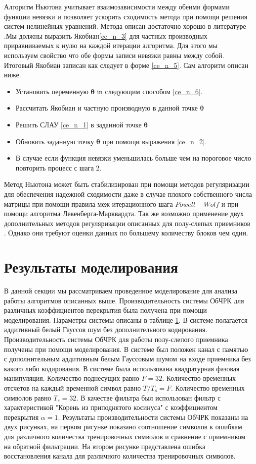 Алгоритм Ньютона учитывает взаимозависимости между обеими формами функции невязки и позволяет ускорить сходимость метода при помощи решения систем нелинейных уравнений. Метода описан достаточно хорошо в литературе \cite{Book62}.Мы должны выразить Якобиан\eqref{ce_n_3} для частных производных приравниваемых к нулю на каждой итерации алгоритма. Для этого мы используем свойство что обе формы записи невязки равны между собой. Итоговый Якобиан записан как следует в форме \eqref{ce_n_5}. Сам алгоритм описан ниже. 
\begin{itemize}
\item Установить переменную $\mathbf{\theta}$ in следующим способом \eqref{ce_n_6}.
\item Рассчитать Якобиан и частную производную в данной точке $\mathbf{\theta}$
\item Решить СЛАУ \eqref{ce_n_1} в заданной точке $\mathbf{\theta}$
\item Обновить заданную точку $\mathbf{\theta}$ при помощи выражения \eqref{ce_n_2}.
\item В случае если функция невязки уменьшилась больше чем на пороговое число повторить процесс с шага 2.
\end{itemize}
Метод Ньютона может быть стабилизирован при помощи методов регуляризации для обеспечения  надежной сходимости даже в случае плохого собственного числа матрицы при помощи правила меж-итерационного шага $Powell-Wolf$ \cite{Book66} и при помощи алгоритма Левенберга-Марквардта\cite{Book65}. Так же возможно применение двух дополнительных методов регуляризации описанных для полу-слепых приемников \cite{Book53}\cite{Book52}. Однако они требуют оценки данных по большему количеству блоков чем один.
\section{Результаты моделирования}
В данной секции мы рассматриваем проведенное моделирование для анализа работы алгоритмов описанных выше.
Производительность системы ОбЧРК для различных коэффициентов перекрытия была получена при помощи моделирования. Параметры системы описаны в таблице \ref{}. В системе полагается аддитивный белый Гауссов шум без дополнительного кодирования.
Производительность системы ОбЧРК для работы полу-слепого приемника получены при помощи моделирования. В системе был положен канал с памятью с дополнительным аддитивным белым Гауссовым шумом на входе приемника без какого либо кодирования. В системе была использована квадратурная фазовая манипуляция. Количество поднесущих равно $F=32$. Количество временных отсчетов на каждый временной символ равно $T/T_s=F$. Количество временных символов равно $T_s=32$. В качестве фильтра был использован фильтр с характеристикой "Корень из приподнятого косинуса" с коэффициентом перекрытия $\alpha=1$.  Результаты производительности системы ОбЧРК  показаны на двух рисунках, на первом рисунке показано соотношение символов к ошибкам для различного количества тренировочных символов и сравнение с приемником на обратной фильтрации. На втором рисунке представлена ошибка восстановления канала для различного количества тренировочных символов.

